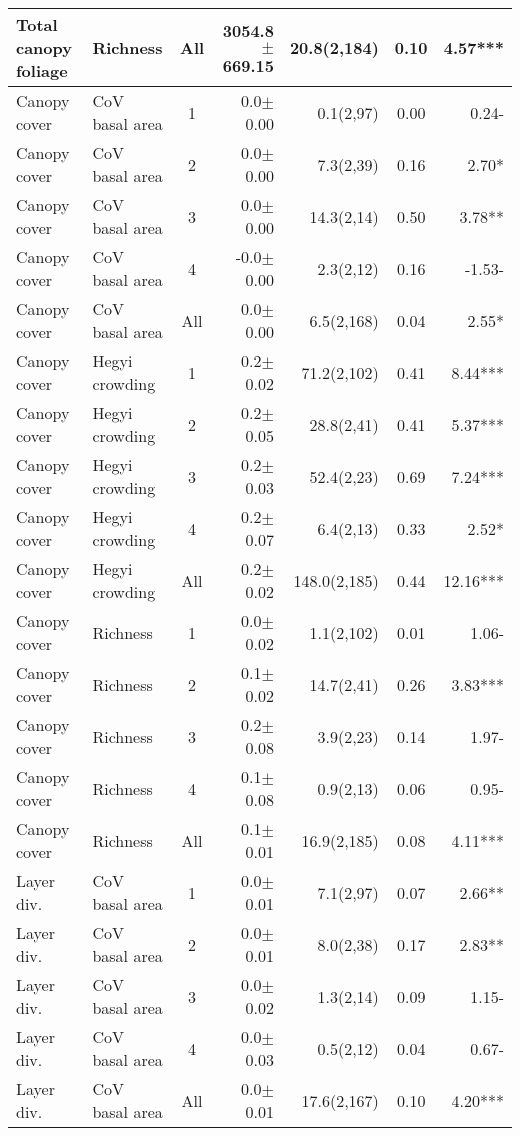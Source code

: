 \begin{longtable}{llcrrS[table-format=1.2]r}
  Total canopy foliage & Richness & All & 3054.8$\pm$669.15 & 20.8(2,184) & 0.10 & 4.57*** \\ 
   \midrule
Canopy cover & CoV basal area & 1 & 0.0$\pm$0.00 & 0.1(2,97) & 0.00 & 0.24- \\ 
  Canopy cover & CoV basal area & 2 & 0.0$\pm$0.00 & 7.3(2,39) & 0.16 & 2.70* \\ 
  Canopy cover & CoV basal area & 3 & 0.0$\pm$0.00 & 14.3(2,14) & 0.50 & 3.78** \\ 
  Canopy cover & CoV basal area & 4 & -0.0$\pm$0.00 & 2.3(2,12) & 0.16 & -1.53- \\ 
  Canopy cover & CoV basal area & All & 0.0$\pm$0.00 & 6.5(2,168) & 0.04 & 2.55* \\ 
   \midrule
Canopy cover & Hegyi crowding & 1 & 0.2$\pm$0.02 & 71.2(2,102) & 0.41 & 8.44*** \\ 
  Canopy cover & Hegyi crowding & 2 & 0.2$\pm$0.05 & 28.8(2,41) & 0.41 & 5.37*** \\ 
  Canopy cover & Hegyi crowding & 3 & 0.2$\pm$0.03 & 52.4(2,23) & 0.69 & 7.24*** \\ 
  Canopy cover & Hegyi crowding & 4 & 0.2$\pm$0.07 & 6.4(2,13) & 0.33 & 2.52* \\ 
  Canopy cover & Hegyi crowding & All & 0.2$\pm$0.02 & 148.0(2,185) & 0.44 & 12.16*** \\ 
   \midrule
Canopy cover & Richness & 1 & 0.0$\pm$0.02 & 1.1(2,102) & 0.01 & 1.06- \\ 
  Canopy cover & Richness & 2 & 0.1$\pm$0.02 & 14.7(2,41) & 0.26 & 3.83*** \\ 
  Canopy cover & Richness & 3 & 0.2$\pm$0.08 & 3.9(2,23) & 0.14 & 1.97- \\ 
  Canopy cover & Richness & 4 & 0.1$\pm$0.08 & 0.9(2,13) & 0.06 & 0.95- \\ 
  Canopy cover & Richness & All & 0.1$\pm$0.01 & 16.9(2,185) & 0.08 & 4.11*** \\ 
   \midrule
Layer div. & CoV basal area & 1 & 0.0$\pm$0.01 & 7.1(2,97) & 0.07 & 2.66** \\ 
  Layer div. & CoV basal area & 2 & 0.0$\pm$0.01 & 8.0(2,38) & 0.17 & 2.83** \\ 
  Layer div. & CoV basal area & 3 & 0.0$\pm$0.02 & 1.3(2,14) & 0.09 & 1.15- \\ 
  Layer div. & CoV basal area & 4 & 0.0$\pm$0.03 & 0.5(2,12) & 0.04 & 0.67- \\ 
  Layer div. & CoV basal area & All & 0.0$\pm$0.01 & 17.6(2,167) & 0.10 & 4.20*** \\ 

\end{longtable}
